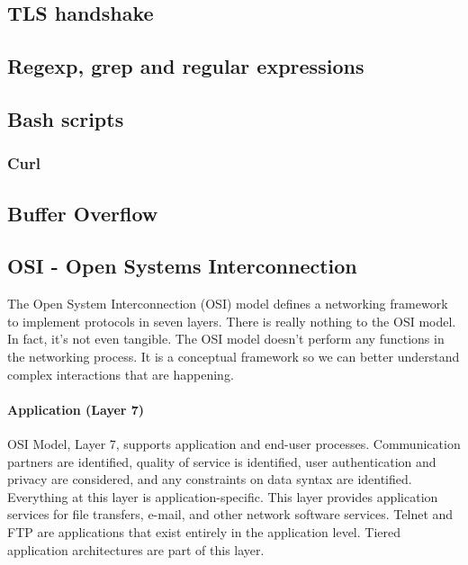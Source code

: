\documentclass{article}[12pt]
\begin{document}
{%
\subsection{TLS handshake}

\subsection{Regexp, grep and regular expressions}
\subsection{Bash scripts}
\subsubsection{Curl}
\label{subsubsec:curl}

\subsection{Buffer Overflow}



\subsection{OSI - Open Systems Interconnection \cite{osi} }
\label{subsec:osi}
The Open System Interconnection (OSI) model defines a networking framework to implement protocols in seven layers.
There is really nothing to the OSI model.
In fact, it's not even tangible.
The OSI model doesn't perform any functions in the networking process.
It is a conceptual framework so we can better understand complex interactions that are happening.


\paragraph{Application (Layer 7)}

OSI Model, Layer 7, supports application and end-user processes.
Communication partners are identified, quality of service is identified, user authentication and privacy are considered, and any constraints on data syntax are identified.
Everything at this layer is application-specific.
This layer provides application services for file transfers, e-mail, and other network software services.
Telnet and FTP are applications that exist entirely in the application level.
Tiered application architectures are part of this layer.

}
\end{document}
